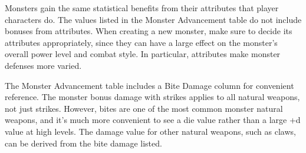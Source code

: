         Monsters gain the same statistical benefits from their attributes that player characters do.
        The values listed in the Monster Advancement table do not include bonuses from attributes.
        When creating a new monster, make sure to decide its attributes appropriately, since they can have a large effect on the monster's overall power level and combat style.
        In particular, attributes make monster defenses more varied.

        The Monster Advancement table includes a Bite Damage column for convenient reference.
        The monster bonus damage with strikes applies to all natural weapons, not just strikes.
        However, bites are one of the most common monster natural weapons, and it's much more convenient to see a die value rather than a large +d value at high levels.
        The damage value for other natural weapons, such as claws, can be derived from the bite damage listed.

